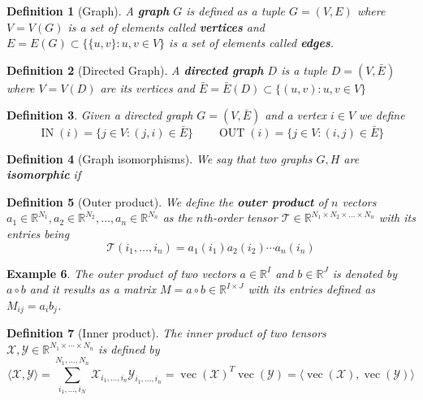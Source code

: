 \documentclass[11pt,a4paper,openright,oneside]{book}
\numberwithin{equation}{section}
\newtheorem{defn0}{Definition}[chapter]
\newtheorem{example0}[defn0]{Example}
\newenvironment{definition}{ \begin{defn0}}{\end{defn0}}
\newenvironment{example}{ \begin{example0}\rm}{\end{example0}}
\DeclareMathOperator{\vectorize}{vec}
\DeclareMathOperator{\IN}{IN}
\DeclareMathOperator{\OUT}{OUT}
\begin{document}
\begin{definition}[Graph]
    A \textbf{graph} $G$ is defined as a tuple $G = (V,E)$ where $V = V(G)$ is a set of elements called \textbf{vertices} and 
    $E = E(G) \subset \{\{u, v\} : u, v \in V\}$ is a set of elements called \textbf{edges}.
\end{definition}

\begin{definition}[Directed Graph]
    A \textbf{directed graph} $D$ is a tuple $D = (V, \bar{E})$ where $V = V(D)$ are its vertices and
    $\bar{E} = \bar{E}(D) \subset \{(u,v) : u,v \in V\}$
\end{definition}

\begin{definition} Given a directed graph $G=(V,\bar{E})$ and a vertex $i \in V$ we define
    $$\IN(i) = \{j \in V : (j, i) \in \bar{E}\} \qquad \OUT(i) = \{j \in V : (i, j) \in \bar{E} \}$$
\end{definition}
\iffalse
\begin{definition}[Graph isomorphisms]
    We say that two graphs $G, H$ are \textbf{isomorphic} if 
\end{definition}


\begin{definition}[Outer product]
    We define the \textbf{outer product} of $n$ vectors 
    $a_1 \in \mathbb{R}^{N_1}, a_2 \in \mathbb{R}^{N_2}, \dots, a_n \in \mathbb{R}^{N_n}$
    as the $n$th-order tensor $\mathcal{T} \in \mathbb{R}^{N_1 \times N_2 \times \dots \times N_n}$ with its entries being
    $$\mathcal{T}(i_1, \dots, i_n) = a_1(i_1) a_2(i_2) \cdots a_n(i_n)$$
\end{definition}

\begin{example}
The outer product of two vectors $a \in \mathbb{R}^I$ and $b \in \mathbb{R}^J$ is denoted by $a \circ b$ and it results
as a matrix $M = a \circ b \in \mathbb{R}^{I \times J}$ with its entries defined as $M_{ij} = a_i b_j$.
\end{example}


\begin{definition}[Inner product]
The inner product of two tensors $\mathcal{X}, \mathcal{Y} \in \mathbb{R}^{N_1 \times \cdots \times N_n}$ is defined by
$$\langle \mathcal{X},\mathcal{Y} \rangle = \sum_{i_1, \dots, i_N}^{N_1, \dots, N_n} \mathcal{X}_{i_1, \dots, i_n} \mathcal{Y}_{i_1, \dots, i_n} = 
\vectorize(\mathcal{X})^T \vectorize(\mathcal{Y}) = \langle \vectorize(\mathcal{X}), \vectorize(\mathcal{Y}) \rangle$$
\end{definition}
\end{document}
